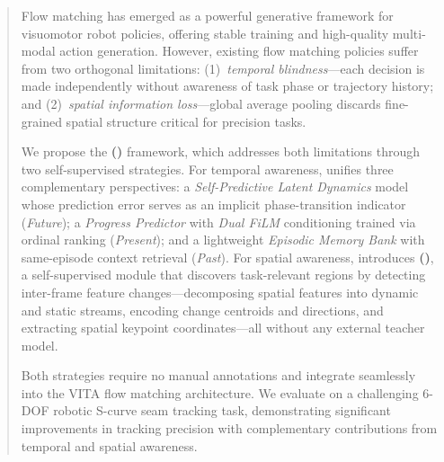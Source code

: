 \begin{abstract}
Flow matching has emerged as a powerful generative framework for visuomotor robot policies, offering stable training and high-quality multi-modal action generation. However, existing flow matching policies suffer from two orthogonal limitations: (1)~\emph{temporal blindness}---each decision is made independently without awareness of task phase or trajectory history; and (2)~\emph{spatial information loss}---global average pooling discards fine-grained spatial structure critical for precision tasks.

We propose the \textbf{\methodfull{} (\method{})} framework, which addresses both limitations through two self-supervised strategies. For temporal awareness, \method{} unifies three complementary perspectives: a \emph{Self-Predictive Latent Dynamics} model whose prediction error serves as an implicit phase-transition indicator (\emph{Future}); a \emph{Progress Predictor} with \emph{Dual FiLM} conditioning trained via ordinal ranking (\emph{Present}); and a lightweight \emph{Episodic Memory Bank} with same-episode context retrieval (\emph{Past}). For spatial awareness, \method{} introduces \textbf{\fasafull{} (\fasa{})}, a self-supervised module that discovers task-relevant regions by detecting inter-frame feature changes---decomposing spatial features into dynamic and static streams, encoding change centroids and directions, and extracting spatial keypoint coordinates---all without any external teacher model.

Both strategies require no manual annotations and integrate seamlessly into the VITA flow matching architecture. We evaluate \method{} on a challenging 6-DOF robotic S-curve seam tracking task, demonstrating significant improvements in tracking precision with complementary contributions from temporal and spatial awareness.
\end{abstract}
